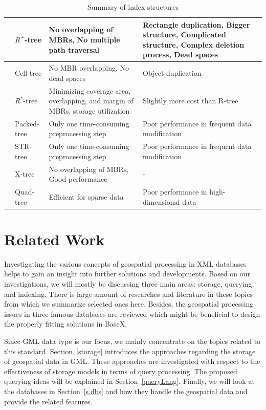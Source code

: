 \documentclass[a4paper,12pt]{article}
\begin{document}
\begin{table}[H]
\begin{tabular}{|>{\centering\arraybackslash}m{8mm}| >{\centering\arraybackslash}m{3cm} | >{\centering\arraybackslash}m{5cm} | >{\centering\arraybackslash}m{5cm} |}
	& $R^+$-tree & No overlapping of MBRs, No multiple path traversal & Rectangle duplication, Bigger structure, Complicated structure, Complex deletion process, Dead spaces\\\cline{2-4}
	& Cell-tree  & No MBR overlapping, No dead spaces & Object duplication\\\cline{2-4}
	& $R^*$-tree  & Minimizing coverage area, overlapping, and margin of MBRs, storage utilization & Slightly more cost than R-tree\\\cline{2-4}
	& Packed-tree & Only one time-consuming preprocessing step& Poor performance in frequent data modification\\\cline{2-4}
	& STR-tree & Only one time-consuming preprocessing step& Poor performance in frequent data modification\\\cline{2-4}
	& X-tree  & No overlapping of MBRs, Good performance & - \\\cline{1-4}
\rotatebox[origin=t]{90}{\begin{minipage}{0.5in}Space filling\end{minipage}} & Quad-tree   & Efficient for sparse data & Poor performance in high-dimensional data \\\hline
\end{tabular}
\caption{Summary of index structures}
\label{t.trees}
\end{table}
\newpage

\section{Related Work}
\label{s.rwork}
Investigating the various concepts of geospatial processing in XML databases helps to gain an insight into further solutions and developments. 
Based on our investigations, we will mostly be discussing three main areas: storage, querying, and indexing. There is large amount of researches and literature in these topics from which we summarize selected ones here. Besides, the geospatial processing issues in three famous databases are reviewed which might be beneficial to design the properly fitting solutions in BaseX. %

Since GML data type is our focus, we mainly concentrate on the topics related to this standard. Section~\ref{storage} introduces the approaches regarding the storage of geospatial data in GML. 
These approaches are investigated with respect to the effectiveness of storage models in terms of query processing. The proposed querying ideas will be explained in Section~\ref{queryLang}. 
Finally, we will look at the databases in Section~\ref{s.dbs} and how they handle the geospatial data and provide the related features.
  
\end{document}
